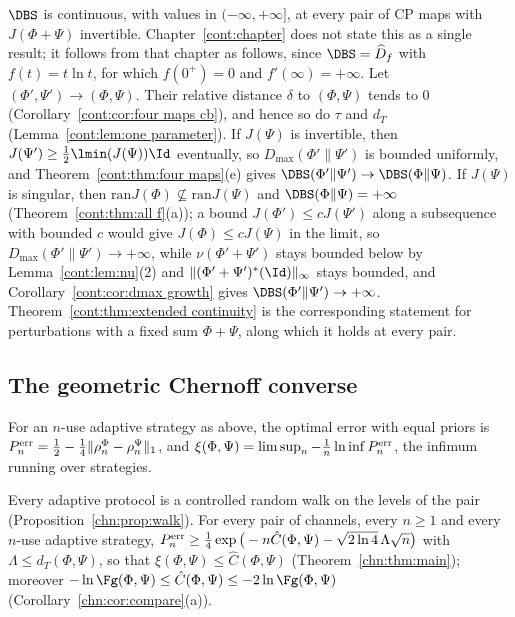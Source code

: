 \begin{remark}\label{gate:smp:rem:dbs}
$\DBS$ is continuous, with values in $(-\infty,+\infty]$, at every pair of CP maps with $J(\Phi+\Psi)$ invertible. Chapter~\ref{cont:chapter} does not state this as a single result; it follows from that chapter as follows, since $\DBS=\widehat D_f$ with $f(t)=t\ln t$, for which $f(0^+)=0$ and $f'(\infty)=+\infty$. Let $(\Phi',\Psi')\to(\Phi,\Psi)$. Their relative distance $\delta$ to $(\Phi,\Psi)$ tends to $0$ (Corollary~\ref{cont:cor:four maps cb}), and hence so do $\tau$ and $d_T$ (Lemma~\ref{cont:lem:one parameter}). If $J(\Psi)$ is invertible, then $J(\Psi')\ge\frac12\lmin(J(\Psi))\Id$ eventually, so $D_{\max}(\Phi'\|\Psi')$ is bounded uniformly, and Theorem~\ref{cont:thm:four maps}(e) gives $\DBS(\Phi'\|\Psi')\to\DBS(\Phi\|\Psi)$. If $J(\Psi)$ is singular, then $\mathrm{ran}J(\Phi)\not\subseteq\mathrm{ran}J(\Psi)$ and $\DBS(\Phi\|\Psi)=+\infty$ (Theorem~\ref{cont:thm:all f}(a)); a bound $J(\Phi')\le cJ(\Psi')$ along a subsequence with bounded $c$ would give $J(\Phi)\le cJ(\Psi)$ in the limit, so $D_{\max}(\Phi'\|\Psi')\to+\infty$, while $\nu(\Phi'+\Psi')$ stays bounded below by Lemma~\ref{cont:lem:nu}(2) and $\|(\Phi'+\Psi')^*(\Id)\|_\infty$ stays bounded, and Corollary~\ref{cont:cor:dmax growth} gives $\DBS(\Phi'\|\Psi')\to+\infty$. Theorem~\ref{cont:thm:extended continuity} is the corresponding statement for perturbations with a fixed sum $\Phi+\Psi$, along which it holds at every pair.
\end{remark}

\subsection*{The geometric Chernoff converse}

For an $n$-use adaptive strategy as above, the optimal error with equal priors is $P^{\rm err}_n=\frac12-\frac14\|\rho^\Phi_n-\rho^\Psi_n\|_1$, and $\xi(\Phi,\Psi)=\limsup_n-\frac1n\ln\inf P^{\rm err}_n$, the infimum running over strategies.

Every adaptive protocol is a controlled random walk on the levels of the pair (Proposition~\ref{chn:prop:walk}). For every pair of channels, every $n\ge1$ and every $n$-use adaptive strategy, $P^{\rm err}_n\ge\tfrac14\exp\big(-n\hat C(\Phi,\Psi)-\sqrt{2\ln4}\,\Lambda\sqrt n\big)$ with $\Lambda\le d_T(\Phi,\Psi)$, so that $\xi(\Phi,\Psi)\le\hat C(\Phi,\Psi)$ (Theorem~\ref{chn:thm:main}); moreover $-\ln\Fg(\Phi,\Psi)\le\hat C(\Phi,\Psi)\le-2\ln\Fg(\Phi,\Psi)$ (Corollary~\ref{chn:cor:compare}(a)).

